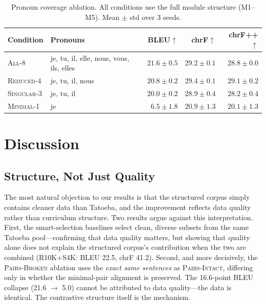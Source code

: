 \documentclass[11pt]{article}
\begin{document}
\begin{table}[t]
\centering
\small
\caption{Pronoun coverage ablation. All conditions use the full module structure (M1--M5). Mean $\pm$ std over 3 seeds.}
\label{tab:pronoun}
\begin{tabular}{llrrr}
\toprule
\textbf{Condition} & \textbf{Pronouns} & \textbf{BLEU}$\uparrow$ & \textbf{chrF}$\uparrow$ & \textbf{chrF++}$\uparrow$ \\
\midrule
\textsc{All-8}      & je, tu, il, elle, nous, vous, ils, elles & $\mathbf{21.6 \pm 0.5}$ & $\mathbf{29.2 \pm 0.1}$ & $\mathbf{28.8 \pm 0.0}$ \\
\textsc{Reduced-4}  & je, tu, il, nous         & $20.8 \pm 0.2$ & $29.4 \pm 0.1$ & $29.1 \pm 0.2$ \\
\textsc{Singular-3} & je, tu, il               & $20.0 \pm 0.2$ & $28.9 \pm 0.4$ & $28.2 \pm 0.4$ \\
\textsc{Minimal-1}  & je                       & $6.5 \pm 1.8$  & $20.9 \pm 1.3$ & $20.1 \pm 1.3$ \\
\bottomrule
\end{tabular}
\end{table}

\section{Discussion}
\label{sec:discussion}

\subsection{Structure, Not Just Quality}

The most natural objection to our results is that the structured corpus simply contains cleaner data than Tatoeba, and the improvement reflects data quality rather than curriculum structure. Two results argue against this interpretation. First, the smart-selection baselines select clean, diverse subsets from the same Tatoeba pool---confirming that data quality matters, but showing that quality alone does not explain the structured corpus's contribution when the two are combined (\textsc{R10K+S4K}: BLEU 22.5, chrF 41.2). Second, and more decisively, the \textsc{Pairs-Broken} ablation uses the \emph{exact same sentences} as \textsc{Pairs-Intact}, differing only in whether the minimal-pair alignment is preserved. The 16.6-point BLEU collapse (21.6 $\rightarrow$ 5.0) cannot be attributed to data quality---the data is identical. The contrastive structure itself is the mechanism.
\end{document}
